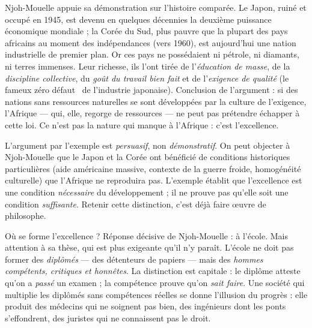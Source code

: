 \documentclass[11pt]{article}
\newcounter{popsec}
\newcounter{popsub}
\newcommand{\courssub}[1]{%
  \stepcounter{popsub}%
  \par\vspace{9pt}\noindent{\popxbold\fontsize{11.5}{13}\selectfont\color{popink}{\color{poporange}\thepopsec.\thepopsub}\hspace{6pt}#1}\par\nopagebreak\vspace{4pt}
}
\begin{document}
\begin{exemplebox}
Njoh-Mouelle appuie sa démonstration sur l'histoire comparée. Le Japon, ruiné et occupé en 1945, est devenu en quelques décennies la deuxième puissance économique mondiale ; la Corée du Sud, plus pauvre que la plupart des pays africains au moment des indépendances (vers 1960), est aujourd'hui une nation industrielle de premier plan. Or ces pays ne possédaient ni pétrole, ni diamants, ni terres immenses. Leur richesse, ils l'ont tirée de l'\emph{éducation de masse}, de la \emph{discipline collective}, du \emph{goût du travail bien fait} et de l'\emph{exigence de qualité} (le fameux \guillemotleft zéro défaut \guillemotright\ de l'industrie japonaise). Conclusion de l'argument : si des nations sans ressources naturelles se sont développées par la culture de l'exigence, l'Afrique — qui, elle, regorge de ressources — ne peut pas prétendre échapper à cette loi. Ce n'est pas la nature qui manque à l'Afrique : c'est l'excellence.
\end{exemplebox}

\begin{attention}
L'argument par l'exemple est \emph{persuasif}, non \emph{démonstratif}. On peut objecter à Njoh-Mouelle que le Japon et la Corée ont bénéficié de conditions historiques particulières (aide américaine massive, contexte de la guerre froide, homogénéité culturelle) que l'Afrique ne reproduira pas. L'exemple établit que l'excellence est une condition \emph{nécessaire} du développement ; il ne prouve pas qu'elle soit une condition \emph{suffisante}. Retenir cette distinction, c'est déjà faire œuvre de philosophe.
\end{attention}

\courssub{L'école, creuset de l'excellence}

Où se forme l'excellence ? Réponse décisive de Njoh-Mouelle : à l'école. Mais attention à sa thèse, qui est plus exigeante qu'il n'y paraît. L'école ne doit pas former des \emph{diplômés} — des détenteurs de papiers — mais des \emph{hommes compétents, critiques et honnêtes}. La distinction est capitale : le diplôme atteste qu'on a \emph{passé} un examen ; la compétence prouve qu'on \emph{sait faire}. Une société qui multiplie les diplômés sans compétences réelles se donne l'illusion du progrès : elle produit des médecins qui ne soignent pas bien, des ingénieurs dont les ponts s'effondrent, des juristes qui ne connaissent pas le droit.
\end{document}
